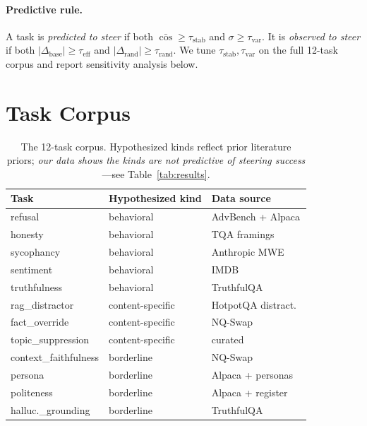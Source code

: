 \documentclass[11pt]{article}
\begin{document}
\paragraph{Predictive rule.}
A task is \emph{predicted to steer} if both
$\bar{\cos} \geq \tau_{\text{stab}}$ and $\sigma \geq \tau_{\text{var}}$.
It is \emph{observed to steer} if both
$|\Delta_{\text{base}}| \geq \tau_{\text{eff}}$ and
$|\Delta_{\text{rand}}| \geq \tau_{\text{rand}}$.
We tune $\tau_{\text{stab}}, \tau_{\text{var}}$ on the full 12-task
corpus and report sensitivity analysis below.

\section{Task Corpus}

\begin{table}[t]
\centering\footnotesize
\setlength{\tabcolsep}{4pt}
\begin{tabular}{l l l}
\toprule
Task & Hypothesized kind & Data source \\
\midrule
refusal              & behavioral       & AdvBench + Alpaca \\
honesty              & behavioral       & TQA framings \\
sycophancy           & behavioral       & Anthropic MWE \\
sentiment            & behavioral       & IMDB \\
truthfulness         & behavioral       & TruthfulQA \\
\midrule
rag\_distractor      & content-specific & HotpotQA distract.~\\
fact\_override       & content-specific & NQ-Swap \\
topic\_suppression   & content-specific & curated \\
\midrule
context\_faithfulness & borderline      & NQ-Swap \\
persona              & borderline       & Alpaca + personas \\
politeness           & borderline       & Alpaca + register \\
halluc.\_grounding   & borderline       & TruthfulQA \\
\bottomrule
\end{tabular}
\caption{The 12-task corpus. Hypothesized kinds reflect prior
literature priors; \emph{our data shows the kinds are not
predictive of steering success}---see
Table~\ref{tab:results}.}
\label{tab:corpus}
\end{table}
\end{document}
